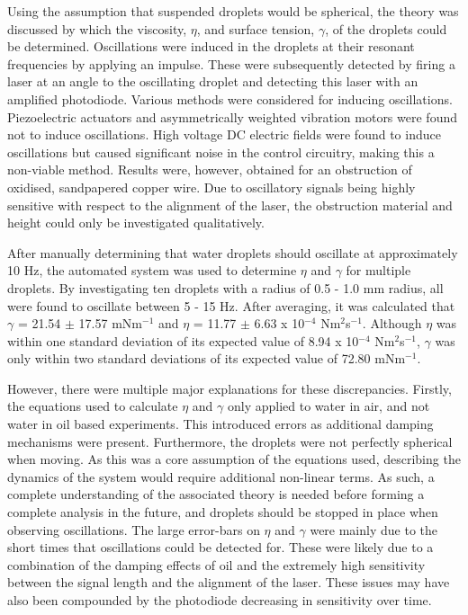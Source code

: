 \documentclass{physics_article_B}
\begin{document}
    Using the assumption that suspended droplets would be spherical, the theory was discussed by which the viscosity, $\eta$, and surface tension, $\gamma$, of the droplets could be determined. Oscillations were induced in the droplets at their resonant frequencies by applying an impulse. These were subsequently detected by firing a laser at an angle to the oscillating droplet and detecting this laser with an amplified photodiode. Various methods were considered for inducing oscillations. Piezoelectric actuators and asymmetrically weighted vibration motors were found not to induce oscillations. High voltage DC electric fields were found to induce oscillations but caused significant noise in the control circuitry, making this a non-viable method. Results were, however, obtained for an obstruction of oxidised, sandpapered copper wire. Due to oscillatory signals being highly sensitive with respect to the alignment of the laser, the obstruction material and height could only be investigated qualitatively. 
    
    After manually determining that water droplets should oscillate at approximately 10 Hz, the automated system was used to determine $\eta$ and $\gamma$ for multiple droplets. By investigating ten droplets with a radius of 0.5 - 1.0 mm radius, all were found to oscillate between 5 - 15 Hz. After averaging, it was calculated that $\gamma$ = 21.54 $\pm$ 17.57 mNm$^{-1}$ and $\eta$ = 11.77 $\pm$ 6.63 x 10$^{-4}$ Nm$^{2}$s$^{-1}$. Although $\eta$ was within one standard deviation of its expected value of \cite{expected2} 8.94 x 10$^{-4}$ Nm$^{2}$s$^{-1}$, $\gamma$ was only within two standard deviations of its expected value of\cite{expected1} 72.80 mNm$^{-1}$.
    
    However, there were multiple major explanations for these discrepancies. Firstly, the equations used to calculate $\eta$ and $\gamma$ only applied to water in air, and not water in oil based experiments. This introduced errors as additional damping mechanisms were present. Furthermore, the droplets were not perfectly spherical when moving. As this was a core assumption of the equations used, describing the dynamics of the system would require additional non-linear terms. As such, a complete understanding of the associated theory is needed before forming a complete analysis in the future, and droplets should be stopped in place when observing oscillations. The large error-bars on $\eta$ and $\gamma$ were mainly due to the short times that oscillations could be detected for. These were likely due to a combination of the damping effects of oil and the extremely high sensitivity between the signal length and the alignment of the laser. These issues may have also been compounded by the photodiode decreasing in sensitivity over time. 
    
\end{document}
